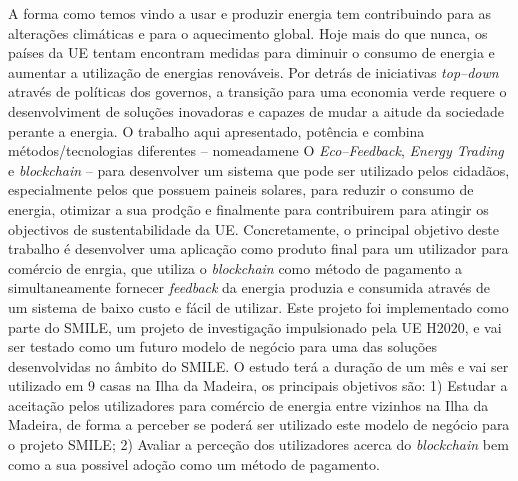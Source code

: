 \noindent 
A forma como temos vindo a usar e produzir energia tem contribuindo para as alterações climáticas e para o aquecimento global. 
Hoje mais do que nunca, os países da \ac{UE} tentam encontram medidas para diminuir o consumo de energia e aumentar a utilização de energias renováveis. Por detrás de iniciativas \textit{top--down} através de políticas dos governos, a transição para uma economia verde requere o desenvolviment de soluções inovadoras e capazes de mudar a aitude da sociedade perante a energia. O trabalho aqui apresentado, potência e combina métodos/tecnologias diferentes -- nomeadamene O \textit{Eco--Feedback}, \textit{Energy Trading} e  \textit{blockchain} -- para desenvolver um sistema que pode ser utilizado pelos cidadãos, especialmente pelos que possuem paineis solares, para reduzir o consumo de energia, otimizar a sua prodção e finalmente para contribuirem para atingir os objectivos de sustentabilidade da \ac{UE}. 
Concretamente, o principal objetivo deste trabalho é desenvolver uma aplicação como produto final para um utilizador para comércio de enrgia, que utiliza o \textit{blockchain} como método de pagamento a simultaneamente fornecer \textit{feedback} da energia produzia e consumida através de um sistema de baixo custo e fácil de utilizar.
Este projeto foi implementado como parte do \ac{SMILE}, um projeto de investigação impulsionado pela \ac{UE} H2020, e vai ser testado como um futuro modelo de negócio para uma das soluções desenvolvidas no âmbito do \ac{SMILE}. 
O estudo terá a duração de um mês e vai ser utilizado em 9 casas na Ilha da Madeira, os principais objetivos são: 1) Estudar a aceitação pelos utilizadores para comércio de energia entre vizinhos na Ilha da Madeira, de forma a perceber se poderá ser utilizado este modelo de negócio para o projeto \ac{SMILE}; 2) Avaliar a perceção dos utilizadores acerca do \textit{blockchain} bem como a sua possivel adoção como um método de pagamento. 
